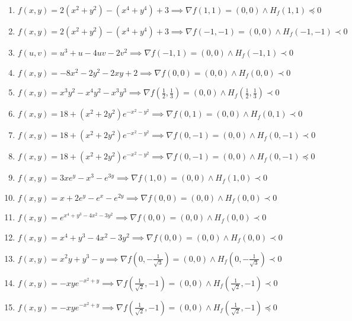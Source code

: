 \documentclass[11pt,a4paper]{article}
\begin{document}
\begin{enumerate}
\item $\displaystyle f(x, y) = 2(x^{2} + y^{2}) - (x^{4} + y^{4}) + 3 \implies \nabla f(1, 1) = (0, 0) \land H_{f}(1, 1) \preceq 0$
\item $\displaystyle f(x, y) = 2(x^{2} + y^{2}) - (x^{4} + y^{4}) + 3 \implies \nabla f(-1, -1) = (0, 0) \land H_{f}(-1, -1) \prec 0$
\item $\displaystyle f(u, v) = u^{3} + u - 4uv - 2v^{2} \implies \nabla f(-1, 1) = (0, 0) \land H_{f}(-1, 1) \prec 0$
\item $\displaystyle f(x, y) = -8x^{2} - 2y^{2} - 2xy + 2 \implies \nabla f(0, 0) = (0, 0) \land H_{f}(0, 0) \prec 0$
\item $\displaystyle f(x, y) = x^{3} y^{2} - x^{4} y^{2} - x^{3} y^{3} \implies \nabla f\left( \frac{1}{2}, \frac{1}{3} \right) = (0, 0) \land H_{f}\left( \frac{1}{2}, \frac{1}{3} \right) \prec 0$
\item $\displaystyle f(x, y) = 18 + (x^{2} + 2y^{2}) e^{-x^{2} - y^{2}} \implies \nabla f(0, 1) = (0, 0) \land H_{f}(0, 1) \prec 0$
\item $\displaystyle f(x, y) = 18 + (x^{2} + 2y^{2}) e^{-x^{2} - y^{2}} \implies \nabla f(0, -1) = (0, 0) \land H_{f}(0, -1) \prec 0$
\item $\displaystyle f(x, y) = 18 + (x^{2} + 2y^{2}) e^{-x^{2} - y^{2}} \implies \nabla f(0, -1) = (0, 0) \land H_{f}(0, -1) \preceq 0$
\item $\displaystyle f(x, y) = 3x e^{y} - x^{3} - e^{3y} \implies \nabla f(1, 0) = (0, 0) \land H_{f}(1, 0) \prec 0$
\item $\displaystyle f(x, y) = x + 2e^{y} - e^{x} - e^{2y} \implies \nabla f(0, 0) = (0, 0) \land H_{f}(0, 0) \prec 0$
\item $\displaystyle f(x, y) = e^{x^{4} + y^{3} - 4x^{2} - 3y^{2}} \implies \nabla f(0, 0) = (0, 0) \land H_{f}(0, 0) \prec 0$
\item $\displaystyle f(x, y) = x^{4} + y^{3} - 4x^{2} - 3y^{2} \implies \nabla f(0, 0) = (0, 0) \land H_{f}(0, 0) \prec 0$
\item $\displaystyle f(x, y) = x^{2} y + y^{3} - y \implies \nabla f\left( 0, -\frac{1}{\sqrt{3}} \right) = (0, 0) \land H_{f}\left( 0, -\frac{1}{\sqrt{3}} \right) \prec 0$
\item $\displaystyle f(x, y) = -xy e^{-x^{2} + y} \implies \nabla f\left( \frac{1}{\sqrt{2}}, -1 \right) = (0, 0) \land H_{f}\left( \frac{1}{\sqrt{2}}, -1 \right) \prec 0$
\item $\displaystyle f(x, y) = -xy e^{-x^{2} + y} \implies \nabla f\left( \frac{1}{\sqrt{2}}, -1 \right) = (0, 0) \land H_{f}\left( \frac{1}{\sqrt{2}}, -1 \right) \preceq 0$

\end{enumerate}
\end{document}
